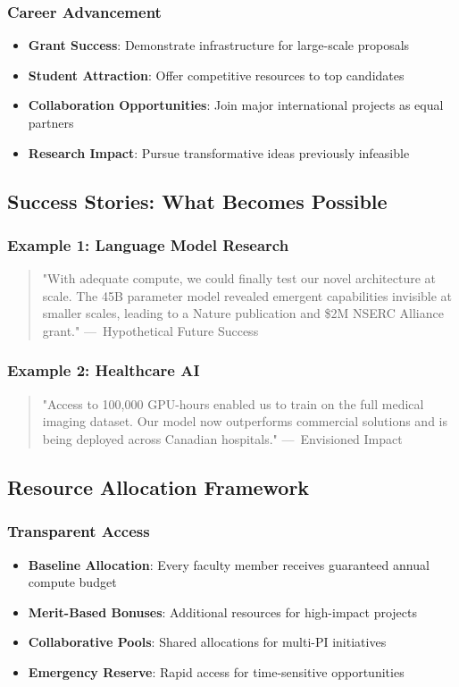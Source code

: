 \subsubsection{Career Advancement}
\begin{itemize}
\item \textbf{Grant Success}: Demonstrate infrastructure for large-scale proposals
\item \textbf{Student Attraction}: Offer competitive resources to top candidates
\item \textbf{Collaboration Opportunities}: Join major international projects as equal partners
\item \textbf{Research Impact}: Pursue transformative ideas previously infeasible
\end{itemize}

\subsection{Success Stories: What Becomes Possible}

\subsubsection{Example 1: Language Model Research}
\begin{quote}
"With adequate compute, we could finally test our novel architecture at scale. The 45B parameter model revealed emergent capabilities invisible at smaller scales, leading to a Nature publication and \$2M NSERC Alliance grant."
---~Hypothetical Future Success
\end{quote}

\subsubsection{Example 2: Healthcare AI}
\begin{quote}
"Access to 100,000 GPU-hours enabled us to train on the full medical imaging dataset. Our model now outperforms commercial solutions and is being deployed across Canadian hospitals."
---~Envisioned Impact
\end{quote}

\subsection{Resource Allocation Framework}

\subsubsection{Transparent Access}
\begin{itemize}
\item \textbf{Baseline Allocation}: Every faculty member receives guaranteed annual compute budget
\item \textbf{Merit-Based Bonuses}: Additional resources for high-impact projects
\item \textbf{Collaborative Pools}: Shared allocations for multi-PI initiatives
\item \textbf{Emergency Reserve}: Rapid access for time-sensitive opportunities
\end{itemize}

